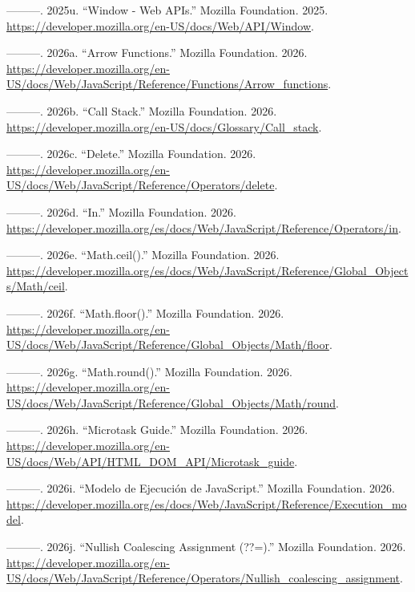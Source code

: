 \documentclass[
  letterpaper,
  DIV=11,
  numbers=noendperiod]{scrreprt}
\newlength{\cslhangindent}
\newenvironment{CSLReferences}[2] %
 {\begin{list}{}{%
  \setlength{\itemindent}{0pt}
  \setlength{\leftmargin}{0pt}
  \setlength{\parsep}{0pt}
  \ifodd #1
   \setlength{\leftmargin}{\cslhangindent}
   \setlength{\itemindent}{-1\cslhangindent}
  \fi
  \setlength{\itemsep}{#2\baselineskip}}}
 {\end{list}}
\begin{document}
\begin{CSLReferences}{1}{0}
---------. 2025u. {``Window - Web APIs.''} Mozilla Foundation. 2025.
\url{https://developer.mozilla.org/en-US/docs/Web/API/Window}.

---------. 2026a. {``Arrow Functions.''} Mozilla Foundation. 2026.
\url{https://developer.mozilla.org/en-US/docs/Web/JavaScript/Reference/Functions/Arrow_functions}.

---------. 2026b. {``Call Stack.''} Mozilla Foundation. 2026.
\url{https://developer.mozilla.org/en-US/docs/Glossary/Call_stack}.

---------. 2026c. {``Delete.''} Mozilla Foundation. 2026.
\url{https://developer.mozilla.org/en-US/docs/Web/JavaScript/Reference/Operators/delete}.

---------. 2026d. {``In.''} Mozilla Foundation. 2026.
\url{https://developer.mozilla.org/es/docs/Web/JavaScript/Reference/Operators/in}.

---------. 2026e. {``Math.ceil().''} Mozilla Foundation. 2026.
\url{https://developer.mozilla.org/es/docs/Web/JavaScript/Reference/Global_Objects/Math/ceil}.

---------. 2026f. {``Math.floor().''} Mozilla Foundation. 2026.
\url{https://developer.mozilla.org/en-US/docs/Web/JavaScript/Reference/Global_Objects/Math/floor}.

---------. 2026g. {``Math.round().''} Mozilla Foundation. 2026.
\url{https://developer.mozilla.org/en-US/docs/Web/JavaScript/Reference/Global_Objects/Math/round}.

---------. 2026h. {``Microtask Guide.''} Mozilla Foundation. 2026.
\url{https://developer.mozilla.org/en-US/docs/Web/API/HTML_DOM_API/Microtask_guide}.

---------. 2026i. {``Modelo de Ejecución de JavaScript.''} Mozilla
Foundation. 2026.
\url{https://developer.mozilla.org/es/docs/Web/JavaScript/Reference/Execution_model}.

---------. 2026j. {``Nullish Coalescing Assignment (??=).''} Mozilla
Foundation. 2026.
\url{https://developer.mozilla.org/en-US/docs/Web/JavaScript/Reference/Operators/Nullish_coalescing_assignment}.


\end{CSLReferences}
\end{document}
